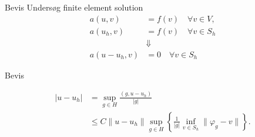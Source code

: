 \begin{frame}{Bevis}
    Undersøg finite element solution
    \begin{align*}
        a(u,v) &= f(v) \quad \forall v \in V, \\
        a(u_h,v) &= f(v) \quad \forall v \in S_h\\
        &\Downarrow \\ 
        a(u-u_h,v) &= 0 \quad \forall v \in S_h
    \end{align*}
\end{frame}

\begin{frame}{Bevis}

    \begin{align*}
        |u-u_h| &= \sup_{g\in H} \frac{(g,u-u_h)}{|g|} \\
        &\leq C \| u-u_h\| \sup_{g\in H} \left \{ \frac{1}{|g|} \inf_{v \in S_h} \|\varphi_g - v\| \right \}.
    \end{align*}
\end{frame}


